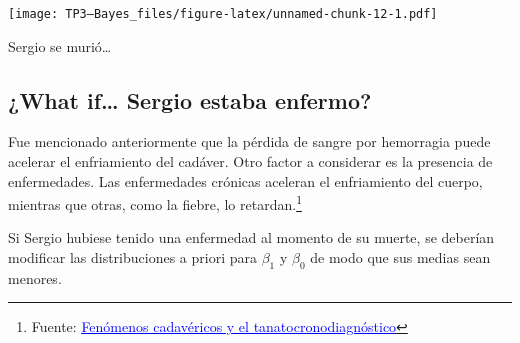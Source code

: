 \documentclass[
]{article}
\begin{document}
\texttt{[image: TP3---Bayes\_files/figure-latex/unnamed-chunk-12-1.pdf]}

Sergio se murió\ldots{}

\hypertarget{what-if-sergio-estaba-enfermo}{%
\subsection{¿What if\ldots{} Sergio estaba
enfermo?}\label{what-if-sergio-estaba-enfermo}}

Fue mencionado anteriormente que la pérdida de sangre por hemorragia
puede acelerar el enfriamiento del cadáver. Otro factor a considerar es
la presencia de enfermedades. Las enfermedades crónicas aceleran el
enfriamiento del cuerpo, mientras que otras, como la fiebre, lo
retardan.\footnote{Fuente:
  \href{chrome-extension://efaidnbmnnnibpcajpcglclefindmkaj/https://www.uv.es/gicf/3R1_Pen\%CC\%83a_GICF_31.pdf}{\textcolor{blue}{\underline{Fenómenos cadavéricos y el tanatocronodiagnóstico}}}}

Si Sergio hubiese tenido una enfermedad al momento de su muerte, se
deberían modificar las distribuciones a priori para \(\beta_1\) y
\(\beta_0\) de modo que sus medias sean menores.
\end{document}
